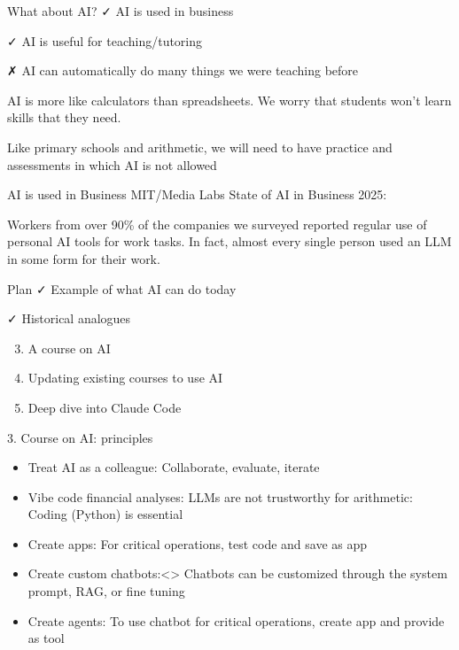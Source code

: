 \documentclass[
  ignorenonframetext,
]{beamer}
\providecommand{\tightlist}{%
  \setlength{\itemsep}{0pt}\setlength{\parskip}{0pt}}
\begin{document}
\begin{frame}{What about AI?}
\label{what-about-ai}
✓ AI is used in business

✓ AI is useful for teaching/tutoring

✗ AI can automatically do many things we were teaching before

AI is more like calculators than spreadsheets. We worry that students
won't learn skills that they need.

Like primary schools and arithmetic, we will need to have practice and
assessments in which AI is not allowed
\end{frame}

\begin{frame}{AI is used in Business}
\label{ai-is-used-in-business}
MIT/Media Labs State of AI in Business 2025:

Workers from over 90\% of the companies we surveyed reported regular use
of personal AI tools for work tasks. In fact, almost every single person
used an LLM in some form for their work.
\end{frame}

\begin{frame}{Plan}
\label{plan-1}
✓ Example of what AI can do today

✓ Historical analogues

\begin{enumerate}
\setcounter{enumi}{2}
\item
  A course on AI
\item
  Updating existing courses to use AI
\item
  Deep dive into Claude Code
\end{enumerate}
\end{frame}

\begin{frame}{3. Course on AI: principles}
\label{course-on-ai-principles}
\begin{itemize}
\tightlist
\item
  {Treat AI as a colleague:} Collaborate, evaluate, iterate
\item
  {Vibe code financial analyses: LLMs are not trustworthy for
  arithmetic:} Coding (Python) is essential
\item
  {Create apps:} For critical operations, test code and save as app
\item
  Create custom chatbots:\textless{}\span\textgreater{} Chatbots can be
  customized through the system prompt, RAG, or fine tuning
\item
  {Create agents:} To use chatbot for critical operations, create app
  and provide as tool
\end{itemize}
\end{frame}
\end{document}
